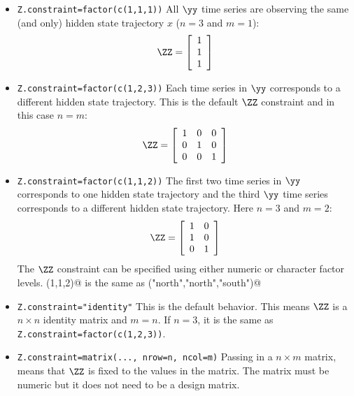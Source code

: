 \begin{itemize}\itemsep5pt
\item[] \texttt{Z.constraint=factor(c(1,1,1))}  All $\yy$ time series are observing the same (and only) hidden state trajectory $x$ ($n=3$ and $m=1$):
\begin{equation*}
 \ZZ =
 \left[ \begin{array}{c}
    1  \\
    1  \\
    1  
    \end{array} \right]  
\end{equation*}

\item[] \texttt{Z.constraint=factor(c(1,2,3))}  Each time series in $\yy$ corresponds to a different hidden state trajectory.  This is the default $\ZZ$ constraint and in this case $n=m$:
\begin{equation*}
 \ZZ =
  \left[ \begin{array}{ccc}
    1 & 0 & 0 \\
    0 & 1 & 0 \\
    0 & 0 & 1 \end{array} \right]
\end{equation*}

\item[] \texttt{Z.constraint=factor(c(1,1,2))} The first two time series in $\yy$ corresponds to one hidden state trajectory and the third $\yy$ time series corresponds to a different hidden state trajectory.  Here $n=3$ and $m=2$:
\begin{equation*}
 \ZZ =
  \left[ \begin{array}{cc}
    1 & 0  \\
    1 & 0  \\
    0 & 1  \end{array} \right]
\end{equation*}
The $\ZZ$ constraint can be specified using either numeric or character factor levels.  \verb@c(1,1,2)@ is the same as \verb@c("north","north","south")@

\item[] \texttt{Z.constraint="identity"} This is the default behavior.  This means $\ZZ$ is a $n \times n$ identity matrix and $m=n$.  If $n=3$, it is the same as \texttt{Z.constraint=factor(c(1,2,3))}.

\item[] \texttt{Z.constraint=matrix(..., nrow=n, ncol=m)}  Passing in a $n \times m$ matrix, means that $\ZZ$ is fixed to the values in the matrix. The matrix must be numeric but it does not need to be a design matrix.

\end{itemize}

